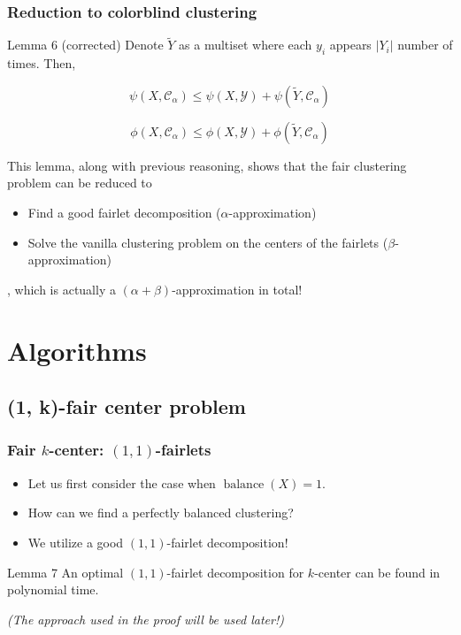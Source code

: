 \documentclass{beamer}
\DeclareMathOperator{\balance}{balance}
\begin{document}


\begin{frame}
\frametitle{Reduction to colorblind clustering}

\begin{block}{Lemma 6 (corrected)}
Denote $\tilde{Y}$ as a multiset where each $y_i$ appears $|Y_i|$ number of times. Then,

$$\psi(X, \mathcal{C}_\alpha) \leq \psi(X, \mathcal{Y}) + \psi(\tilde{Y}, \mathcal{C}_\alpha)$$

$$\phi(X, \mathcal{C}_\alpha) \leq \phi(X, \mathcal{Y}) + \phi(\tilde{Y}, \mathcal{C}_\alpha)$$

\end{block} \pause

This lemma, along with previous reasoning, shows that the fair clustering problem can be reduced to
\begin{itemize}
	\item Find a good fairlet decomposition ($\alpha$-approximation)
	\item Solve the vanilla clustering problem on the centers of the fairlets ($\beta$-approximation)
\end{itemize}
, which is actually a $(\alpha + \beta)$-approximation in total!

\end{frame}


\section{Algorithms}


\subsection{(1, k)-fair center problem}

\begin{frame}
\frametitle{Fair $k$-center: $(1, 1)$-fairlets}

\begin{itemize}
	\item Let us first consider the case when $\balance(X) = 1$. \pause
	
	\item How can we find a perfectly balanced clustering? \pause
	
	\item We utilize a good $(1, 1)$-fairlet decomposition! \pause
\end{itemize}

\begin{block}{Lemma 7}
An optimal $(1, 1)$-fairlet decomposition for $k$-center can be found in polynomial time.

\end{block}
{\it (The approach used in the proof will be used later!)}

\end{frame}
\end{document}
